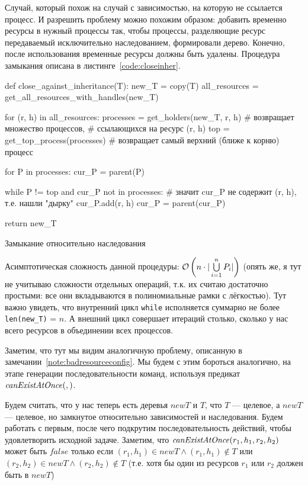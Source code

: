 Случай, который похож на случай с зависимостью, на которую не ссылается процесс. И разрешить проблему можно похожим образом: добавить временно ресурсы в нужный процессы так, чтобы процессы, разделяющие ресурс передаваемый исключительно наследованием, формировали дерево. Конечно, после использования временные ресурсы должны быть удалены.
Процедура замыкания описана в листинге~\ref{code:closeinher}.

\begin{listing}[ht!]
\begin{pythoncode}
def close_against_inheritance(T):
    new_T = copy(T)
    all_resources = get_all_resources_with_handles(new_T)

    for (r, h) in all_resources:
        processes = get_holders(new_T, r, h)  # возвращает множество процессов, 
                                              # ссылающихся на ресурс (r, h)
        top = get_top_process(processes)  # возвращает самый верхний (ближе к корню) процесс

        for P in processes:
            cur_P = parent(P)

            while P != top and cur_P not in processes:
                # значит cur_P не содержит (r, h), т.е. нашли "дырку"
                cur_P.add(r, h)
                cur_P = parent(cur_P)

    return new_T
\end{pythoncode}

\caption{Замыкание относительно наследования}
\label{code:closeinher}
\end{listing}

Асимптотическая сложность данной процедуры:  $\mathcal{O}\left(n\cdot|\bigcup\limits_{i = 1}^{n}{P_i}|\right)$ (опять же, я тут не учитываю сложности отдельных операций, т.к. их считаю достаточно простыми: все они вкладываются в полиномиальные рамки с лёгкостью). Тут важно увидеть, что внутренний цикл \texttt{while} исполняется суммарно не более \texttt{len(new\_T)} = $n$. А внешний цикл совершает итераций столько, сколько у нас всего ресурсов в объединении всех процессов.

Заметим, что тут мы видим аналогичную проблему, описанную в замечании~\ref{note:badresourceconfig}. Мы будем с этим бороться аналогично, на этапе генерации последовательности команд, используя предикат $\text{\textit{canExistAtOnce}}(, )$.

Будем считать, что у нас теперь есть деревья $newT$ и $T$, что $T$ --- целевое, а $newT$ --- целевое, но замкнутое относительно зависимостей и наследования. Будем работать с первым, после чего подкрутим последовательность действий, чтобы удовлетворить исходной задаче. Заметим, что $\text{\textit{canExistAtOnce}}(r_1, h_1, r_2, h_2)$ может быть $false$ только если $(r_1, h_1) \in newT \land (r_1, h_1) \notin T$ или $(r_2, h_2) \in newT \land (r_2, h_2) \notin T$ (т.е. хотя бы один из ресурсов $r_1$ или $r_2$ должен быть в $newT$)

